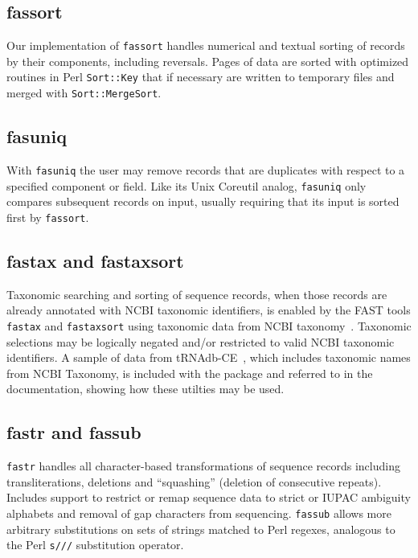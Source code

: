 \documentclass{frontiersSCNS} %
\begin{document}
\subsection{fassort}

Our implementation of {\tt fassort} handles numerical and textual
sorting of records by their components, including reversals. Pages of data are sorted with
optimized routines in Perl {\tt Sort::Key} that if necessary are
written to temporary files and merged with {\tt Sort::MergeSort}.

\subsection{fasuniq}

With {\tt fasuniq} the user may remove records that are duplicates
with respect to a specified component or field. Like its Unix
Coreutil analog, {\tt fasuniq} only compares subsequent records on
input, usually requiring that its input is sorted first by {\tt fassort}.

\subsection{fastax and fastaxsort}

Taxonomic searching and sorting of sequence records, when those
records are already annotated with NCBI taxonomic identifiers, is
enabled by the FAST tools {\tt fastax} and {\tt fastaxsort} using
taxonomic data from NCBI taxonomy~\citep{Benson2009,
  Sayers2009}. Taxonomic selections may be logically negated and/or
restricted to valid NCBI taxonomic identifiers. A sample
of data from tRNAdb-CE~\citep{10.3389/fgene.2014.00114}, which
includes taxonomic names from NCBI Taxonomy, is included with the
package and referred to in the documentation, showing how these
utilties may be used.

\subsection{fastr and fassub} 

{\tt fastr} handles all character-based transformations of sequence
records including transliterations, deletions and ``squashing''
(deletion of consecutive repeats). Includes support to restrict or remap 
sequence data to strict or IUPAC ambiguity alphabets and removal of
gap characters from sequencing. {\tt fassub} allows more arbitrary
substitutions on sets of strings matched to Perl regexes, analogous to
the Perl {\tt s///} substitution operator.
\end{document}
